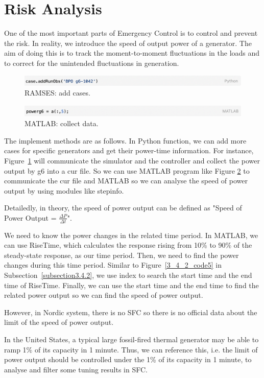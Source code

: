 \section{Risk Analysis} %
One of the most important parts of Emergency Control is to control and prevent the risk.  In reality, we introduce the speed of output power of a generator. The aim of doing this is to track the moment-to-moment fluctuations in the loads and to correct for the unintended fluctuations in generation. 


\begin{figure}[htbp]
\centering
\includegraphics[width = .819\textwidth]{figure/6_5_code1.png}
\caption{RAMSES: add cases.}
\label{6_5_code1}
\end{figure}


\begin{figure}[htbp]
\centering
\includegraphics[width = .819\textwidth]{figure/6_5_code2.png}
\caption{MATLAB: collect data.}
\label{6_5_code2}
\end{figure}

The implement methods are as follows. In Python function, we can add more cases for specific generators and get their power-time information. For instance, Figure~\ref{6_5_code1} will communicate the simulator and the controller and collect the power output by g6 into a cur file. So we can use MATLAB program like Figure \textcolor{red}{\ref{6_5_code2}} to communicate the cur file and MATLAB so we can analyse the speed of power output by using modules like stepinfo. 


Detailedly, in theory, the speed of power output can be defined as "Speed of Power Output = $\frac{\Delta P}{\Delta t}$". 

We need to know the power changes in the related time period. In MATLAB, we can use RiseTime, which calculates the response rising from 10\% to 90\% of the steady-state response, as our time period. Then, we need to find the power changes during this time period. Similar to Figure~\ref{3_4_2_code5} in Subsection~\ref{subsection3.4.2}, we use index to search the start time and the end time of RiseTime. Finally,  we can use the start time and the end time to find the related power output so we can find the speed of power output. 


However, in Nordic system, there is no SFC so there is no official data about the limit of the speed of power output.  

In the United States, a typical large fossil-fired thermal generator may be able to ramp 1\% of its capacity in 1 minute. Thus, we can reference this, i.e. the limit of power output should be controlled under the 1\% of its capacity in 1 minute, to analyse and filter some tuning results in SFC. 